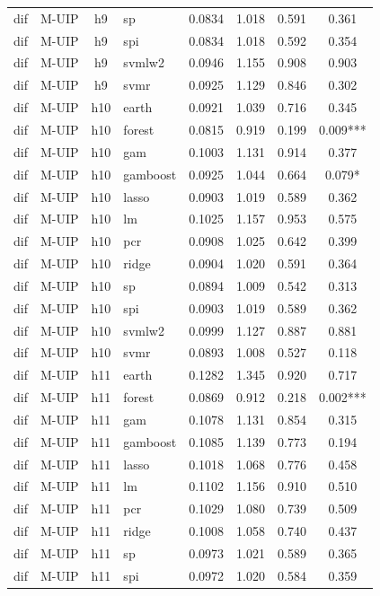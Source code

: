 \begin{ThreePartTable}
\begin{longtable}[t]{llclcccc}
dif & M-UIP & h9 & sp & 0.0834 & 1.018 & 0.591 & 0.361\\
dif & M-UIP & h9 & spi & 0.0834 & 1.018 & 0.592 & 0.354\\
dif & M-UIP & h9 & svmlw2 & 0.0946 & 1.155 & 0.908 & 0.903\\
dif & M-UIP & h9 & svmr & 0.0925 & 1.129 & 0.846 & 0.302\\
\addlinespace
dif & M-UIP & h10 & earth & 0.0921 & 1.039 & 0.716 & 0.345\\
dif & M-UIP & h10 & forest & 0.0815 & 0.919 & 0.199 & 0.009***\\
dif & M-UIP & h10 & gam & 0.1003 & 1.131 & 0.914 & 0.377\\
dif & M-UIP & h10 & gamboost & 0.0925 & 1.044 & 0.664 & 0.079*\\
dif & M-UIP & h10 & lasso & 0.0903 & 1.019 & 0.589 & 0.362\\
dif & M-UIP & h10 & lm & 0.1025 & 1.157 & 0.953 & 0.575\\
dif & M-UIP & h10 & pcr & 0.0908 & 1.025 & 0.642 & 0.399\\
dif & M-UIP & h10 & ridge & 0.0904 & 1.020 & 0.591 & 0.364\\
dif & M-UIP & h10 & sp & 0.0894 & 1.009 & 0.542 & 0.313\\
dif & M-UIP & h10 & spi & 0.0903 & 1.019 & 0.589 & 0.362\\
dif & M-UIP & h10 & svmlw2 & 0.0999 & 1.127 & 0.887 & 0.881\\
dif & M-UIP & h10 & svmr & 0.0893 & 1.008 & 0.527 & 0.118\\
\addlinespace
dif & M-UIP & h11 & earth & 0.1282 & 1.345 & 0.920 & 0.717\\
dif & M-UIP & h11 & forest & 0.0869 & 0.912 & 0.218 & 0.002***\\
dif & M-UIP & h11 & gam & 0.1078 & 1.131 & 0.854 & 0.315\\
dif & M-UIP & h11 & gamboost & 0.1085 & 1.139 & 0.773 & 0.194\\
dif & M-UIP & h11 & lasso & 0.1018 & 1.068 & 0.776 & 0.458\\
dif & M-UIP & h11 & lm & 0.1102 & 1.156 & 0.910 & 0.510\\
dif & M-UIP & h11 & pcr & 0.1029 & 1.080 & 0.739 & 0.509\\
dif & M-UIP & h11 & ridge & 0.1008 & 1.058 & 0.740 & 0.437\\
dif & M-UIP & h11 & sp & 0.0973 & 1.021 & 0.589 & 0.365\\
dif & M-UIP & h11 & spi & 0.0972 & 1.020 & 0.584 & 0.359\\

\end{longtable}
\end{ThreePartTable}
